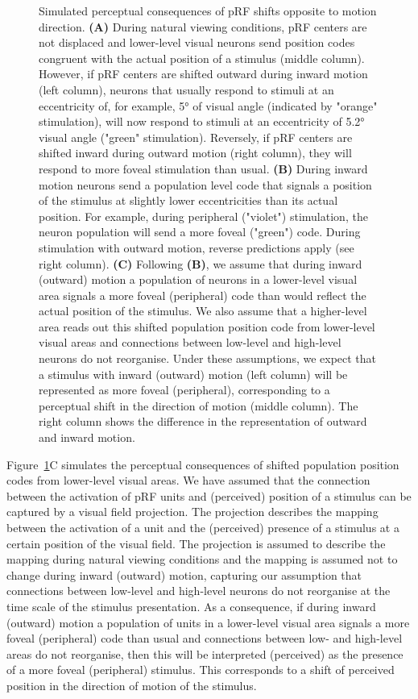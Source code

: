 \begin{figure}[htb!]
\ContinuedFloat
\captionsetup{labelformat=adja-page}
\caption{Simulated perceptual consequences of pRF shifts opposite to motion direction. \textbf{(A)} During natural viewing conditions, pRF centers are not displaced and lower-level visual neurons send position codes congruent with the actual position of a stimulus (middle column). However, if pRF centers are shifted outward during inward motion (left column), neurons that usually respond to stimuli at an eccentricity of, for example, 5° of visual angle (indicated by "orange" stimulation), will now respond to stimuli at an eccentricity of 5.2° visual angle ("green" stimulation). Reversely, if pRF centers are shifted inward during outward motion (right column), they will respond to more foveal stimulation than usual. \textbf{(B)} During inward motion neurons send a population level code that signals a position of the stimulus at slightly lower eccentricities than its actual position. For example, during peripheral ("violet") stimulation, the neuron population will send a more foveal ("green") code.  During stimulation with outward motion, reverse predictions apply (see right column). \textbf{(C)} Following \textbf{(B)}, we assume that during inward (outward) motion a population of neurons in a lower-level visual area signals a more foveal (peripheral) code than would reflect the actual position of the stimulus. We also assume that a higher-level area reads out this shifted population position code from lower-level visual areas and connections between low-level and high-level neurons do not reorganise. Under these assumptions, we expect that a stimulus with inward (outward) motion (left column) will be represented as more foveal (peripheral), corresponding to a perceptual shift in the direction of motion (middle column). The right column shows the difference in the representation of outward and inward motion.}
\label{fig:modelOv}
\noindent\hrulefill
\end{figure}

Figure~\ref{fig:modelOv}C simulates the perceptual consequences of shifted population position codes from lower-level visual areas. We have assumed that the connection between the activation of pRF units and (perceived) position of a stimulus can be captured by a visual field projection. The projection describes the mapping between the activation of a unit and the (perceived) presence of a stimulus at a certain position of the visual field. The projection is assumed to describe the mapping during natural viewing conditions and the mapping is assumed not to change during inward (outward) motion, capturing our assumption that connections between low-level and high-level neurons do not reorganise at the time scale of the stimulus presentation. As a consequence, if during inward (outward) motion a population of units in a lower-level visual area signals a more foveal (peripheral) code than usual and connections between low- and high-level areas do not reorganise, then this will be interpreted (perceived) as the presence of a more foveal (peripheral) stimulus. This corresponds to a shift of perceived position in the direction of motion of the stimulus.

